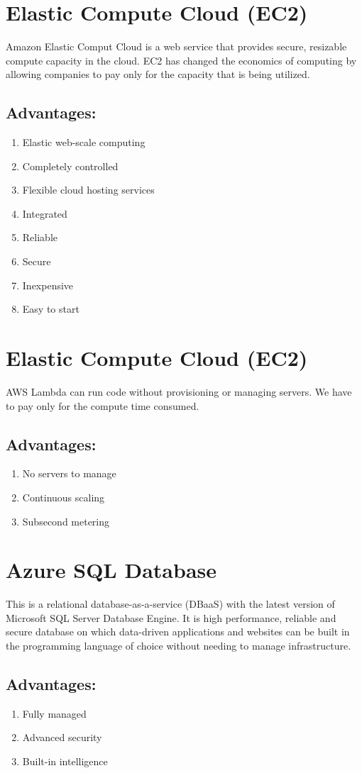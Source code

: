\section{Elastic Compute Cloud (EC2)} \cite{EC2Doc}
Amazon Elastic Comput Cloud is a web service that provides secure, resizable compute capacity in the cloud. EC2 has changed the economics of computing by allowing companies to pay only for the capacity that is being utilized.

\subsection{Advantages:}
\begin{enumerate}
	\item Elastic web-scale computing
	\item Completely controlled
	\item Flexible cloud hosting services
	\item Integrated
	\item Reliable
	\item Secure
	\item Inexpensive
	\item Easy to start
\end{enumerate}

\section{Elastic Compute Cloud (EC2)} \cite{LambdaDoc}
AWS Lambda can run code without provisioning or managing servers. We have to pay only for the compute time consumed.

\subsection{Advantages:}
\begin{enumerate}
	\item No servers to manage
	\item Continuous scaling
	\item Subsecond metering
\end{enumerate}

\section{Azure SQL Database}
This is a relational database-as-a-service (DBaaS) with the latest version of Microsoft SQL Server Database Engine. It is high performance, reliable and secure database on which data-driven applications and websites can be built in the programming language of choice without needing to manage infrastructure.\cite{AzureSQLDB}

\subsection{Advantages:}
\begin{enumerate}
	\item Fully managed
	\item Advanced security
	\item Built-in intelligence
\end{enumerate}